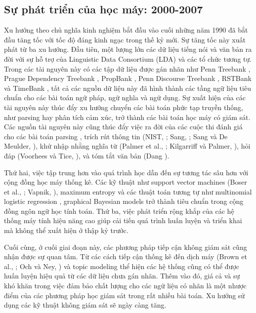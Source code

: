 \subsection{Sự phát triển của học máy: 2000-2007}

Xu hướng theo chủ nghĩa kinh nghiệm bắt đầu vào cuối những năm 1990 đã bắt đầu tăng tốc với tốc độ đáng kinh ngạc trong thế kỷ mới. Sự tăng tốc này xuất phát từ ba xu hướng. Đầu tiên, một lượng lớn các dữ liệu tiếng nói và văn bản ra đời với sự hỗ trợ của Linguistic Data Consortium (LDA) và các tổ chức tương tự. Trong các tài nguyên này có các tập dữ liệu được gán nhãn như Penn Treebank \citep{marcus1993building}, Prague Dependency Treebank \citep{hajic:1998}, PropBank \citep{palmer2005proposition}, Penn Discourse Treebank \citep{miltsakaki2004penn}, RSTBank \citep{carlson2001discourse} và TimeBank \citep{pustejovsky2003timebank}, tất cả các nguồn dữ liệu này đã hình thành các tầng ngữ liệu tiêu chuẩn cho các bài toán ngữ pháp, ngữ nghĩa và ngữ dụng. Sự xuất hiện của các tài nguyên này thúc đẩy xu hướng chuyển các bài toán phức tạp truyền thống, như parsing hay phân tích cảm xúc, trở thành các bài toán học máy có giám sát. Các nguồn tài nguyên này cũng thúc đẩy việc ra đời của các cuộc thi đánh giá cho các bài toán parsing \citep{sang2001introduction}, trích rút thông tin (NIST, \citeyear{nist2007}; Sang, \citeyear{TjongKimSang:2002:ICS:1118853.1118877}; Sang và De Meulder, \citeyear{tjong2003introduction}), khử nhập nhằng nghĩa từ (Palmer et al., \citeyear{Palmer:2001:ETA:2387364.2387369}; Kilgarriff và Palmer, \citeyear{Kilgarriff2000IntroductionTT}), hỏi đáp (Voorhees và Tice, \citeyear{Voorhees1999TheTQ}), và tóm tắt văn bản (Dang \citeyear{Dang06overviewof}).

Thứ hai, việc tập trung hơn vào quá trình học dẫn đến sự tương tác sâu hơn với cộng đồng học máy thống kê. Các kỹ thuật như support vector machines (Boser et al., \citeyear{Boser1992ATA}; Vapnik, \citeyear{Cortes1995SupportvectorN}), maximum entropy và các thuật toán tương tự như multinomial logistic regression \citep{Berger1996AME}, graphical Bayesian models \citep{Pearl1988ProbabilisticRI} trở thành tiêu chuẩn trong cộng đồng ngôn ngữ học tính toán. Thứ ba, việc phát triển rộng khắp của các hệ thống máy tính hiệu năng cao giúp cải tiến quá trình huấn luyện và triển khai mà không thể xuất hiện ở thập kỷ trước.

Cuối cùng, ở cuối giai đoạn này, các phương pháp tiếp cận không giám sát cũng nhận được sự quan tâm. Từ các cách tiếp cận thống kê đến dịch máy (Brown et al., \citeyear{Brown1990ASA}; Och và Ney, \citeyear{Och2003ASC}) và topic modeling \citep{Blei2003LatentDA} thể hiện các hệ thống cũng có thể được huấn luyện hiệu quả từ các dữ liệu chưa gán nhãn. Thêm vào đó, giá cả và sự khó khăn trong việc đảm bảo chất lượng cho các ngữ liệu có nhãn là một nhược điểm của các phương pháp học giám sát trong rất nhiều bài toán. Xu hướng sử dụng các kỹ thuật không giám sát sẽ ngày càng tăng.

